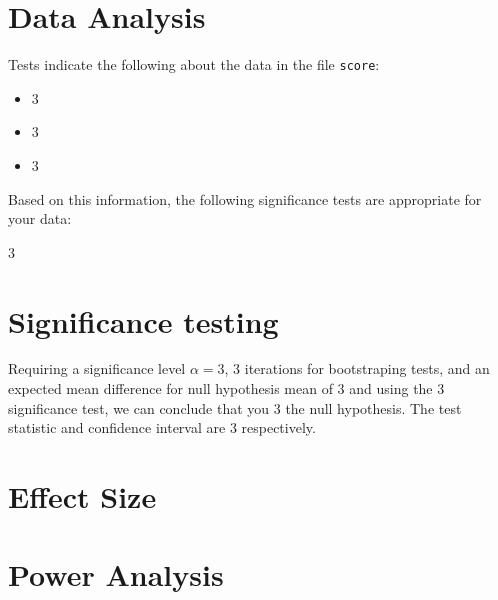 \documentclass{article}
\begin{document}
\section{Data Analysis}

Tests indicate the following about the data in the file \texttt{score}:

\begin{itemize}
  \item 3
  \item 3
  \item 3
\end{itemize}

Based on this information, the following significance tests are appropriate for your data:

3

\section{Significance testing}

Requiring a significance level $\alpha = 3$, 3 iterations for bootstraping tests, and an expected mean difference for null hypothesis mean of 3 and using the 3 significance test, we can conclude that you 3 the null hypothesis. The test statistic and confidence interval are 3 respectively.

\section{Effect Size}

\section{Power Analysis}
\end{document}
